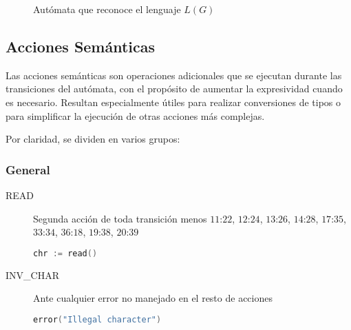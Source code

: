 \documentclass[a4paper]{CSMakotoTechnicalReport}
\begin{document}
\begin{figure}[ht]
        \vspace{0.03\textheight}
        \caption{Autómata que reconoce el lenguaje $L(G)$}
        \label{fig:automaton}
    \end{figure}

    \vspace{0.01\textheight}

    \subsection{Acciones Semánticas}
    \label{subsec:acciones-semanticas}

    Las acciones semánticas son operaciones adicionales que se ejecutan durante las transiciones del autómata, con el propósito de aumentar la expresividad cuando es necesario. Resultan especialmente útiles para realizar conversiones de tipos o para simplificar la ejecución de otras acciones más complejas.

    Por claridad, se dividen en varios grupos:

    \subsubsection{General}

    \lstset{
        aboveskip=8pt,
        belowskip=8pt,
        basicstyle=\ttfamily\small,
        breaklines=true,
        frame=single
    }

    \begin{description}
        \item[READ] Segunda acción de toda transición menos $11$:$22$, $12$:$24$, $13$:$26$, $14$:$28$, $17$:$35$, $33$:$34$, $36$:$18$, $19$:$38$, $20$:$39$
            \begin{lstlisting}[language=C]
 chr := read()
            \end{lstlisting}

        \item[INV\_CHAR] Ante cualquier error no manejado en el resto de acciones
            \begin{lstlisting}[language=C]
 error("Illegal character")
            \end{lstlisting}
    \end{description}
\end{document}
